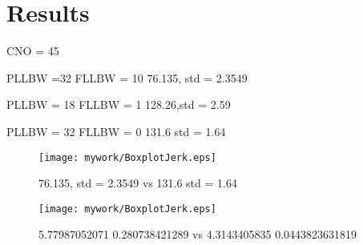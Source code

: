 \chapter{Results}\label{ch:Results}

CNO = 45

PLLBW =32
FLLBW = 10
76.135, std = 2.3549

PLLBW = 18
FLLBW = 1
128.26,std =  2.59 

PLLBW = 32
FLLBW = 0
131.6 std = 1.64

\begin{figure}[!htb] 
    \centering
    \texttt{[image: mywork/BoxplotJerk.eps]} 
    \caption{ 76.135, std = 2.3549 vs 131.6 std = 1.64}
    \label{fig:BoxplotJerk}
\end{figure}


\begin{figure}[!htb] 
    \centering
    \texttt{[image: mywork/BoxplotJerk.eps]} 
    \caption{5.77987052071 0.280738421289 vs 4.3143405835 0.0443823631819}
    \label{fig:BoxplotPhaseJitter}
\end{figure}

